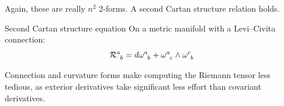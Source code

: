 Again, these are really $ n^2 $ 2-forms. A second Cartan structure relation holds.

\begin{theorem}{Second Cartan structure equation}{}
  On a metric manifold with a Levi--Civita connection:
  \begin{equation}
    \tensor{\mathcal{R}}{^a_b} = \tensor{d\omega}{^a_b} + \tensor{\omega}{^a_c} \wedge \tensor{\omega}{^c_b}
    \label{eq:second-cartan-stru-eq}
  \end{equation}
\end{theorem}

Connection and curvature forms make computing the Riemann tensor less tedious, as exterior derivatives take significant less effort than covariant derivatives.










